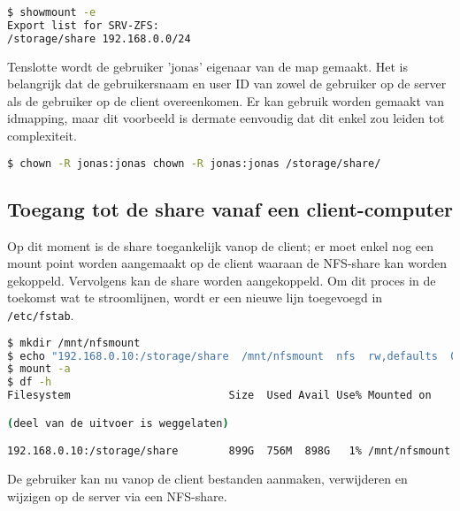 \begin{lstlisting}[language=bash,style=command_style]
$ showmount -e
Export list for SRV-ZFS:
/storage/share 192.168.0.0/24
\end{lstlisting}

Tenslotte wordt de gebruiker 'jonas' eigenaar van de map gemaakt. Het is belangrijk dat de gebruikersnaam en user ID van zowel de gebruiker op de server als de gebruiker op de client overeenkomen. Er kan gebruik worden gemaakt van idmapping, maar dit voorbeeld is dermate eenvoudig dat dit enkel zou leiden tot complexiteit. 

\begin{lstlisting}[language=bash,style=command_style]
$ chown -R jonas:jonas chown -R jonas:jonas /storage/share/
\end{lstlisting}

\subsection{Toegang tot de share vanaf een client-computer}

Op dit moment is de share toegankelijk vanop de client; er moet enkel nog een mount point worden aangemaakt op de client waaraan de NFS-share kan worden gekoppeld. Vervolgens kan de share worden aangekoppeld. Om dit proces in de toekomst wat te stroomlijnen, wordt er een nieuwe lijn toegevoegd in \texttt{/etc/fstab}.

\begin{lstlisting}[language=bash,style=command_style]
$ mkdir /mnt/nfsmount
$ echo "192.168.0.10:/storage/share  /mnt/nfsmount  nfs  rw,defaults  0 2" >> /etc/fstab
$ mount -a
$ df -h
Filesystem                         Size  Used Avail Use% Mounted on

(deel van de uitvoer is weggelaten)

192.168.0.10:/storage/share        899G  756M  898G   1% /mnt/nfsmount
\end{lstlisting}

De gebruiker kan nu vanop de client bestanden aanmaken, verwijderen en wijzigen op de server via een NFS-share.
